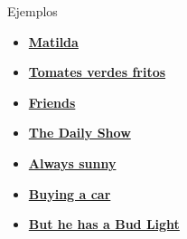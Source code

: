 \documentclass{beamer}
\begin{document}
\begin{frame}{Ejemplos}
    \begin{itemize}
    \item \href{https://www.youtube.com/watch?v=qlg0qakJhKU}{\textbf{Matilda}}
    \item \href{https://www.youtube.com/watch?v=akA8co61He4}{\textbf{Tomates verdes fritos}}
    \item \href{https://www.youtube.com/watch?v=X8BPfLhH6MA}{\textbf{Friends}}
    \item \href{https://videos.criticalcommons.org/media/encoded/16/jtierney86/43ba1b1ac3e94df3974f987cc912ae_Hxgbfl1.mp4}{\textbf{The Daily Show}}
    \item \href{http://videos.criticalcommons.org/transcoded/http/www.criticalcommons.org/Members/JJWooten/clips/always-sunny-paying-for-care/video_file/mp4-high/always-sunny-cost-of-care-mp4.mp4}{\textbf{Always sunny}}
    \item \href{https://www.youtube.com/watch?v=SrPu-xGrKrk}{\textbf{Buying a car}}
    \item \href{https://www.youtube.com/watch?v=ZZq0ShjEd-E}{\textbf{But he has a Bud Light}}
    \end{itemize}
\end{frame}
\end{document}
